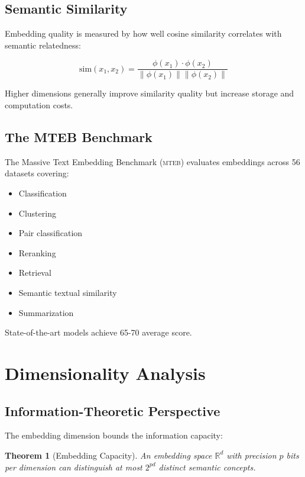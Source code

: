 \documentclass[11pt,letterpaper]{article}
\newtheorem{theorem}{Theorem}[section]
\newcommand{\MTEB}{\textsc{mteb}}
\begin{document}
\subsection{Semantic Similarity}

Embedding quality is measured by how well cosine similarity correlates with semantic relatedness:

\begin{equation}
\text{sim}(x_1, x_2) = \frac{\phi(x_1) \cdot \phi(x_2)}{\|\phi(x_1)\| \|\phi(x_2)\|}
\end{equation}

Higher dimensions generally improve similarity quality but increase storage and computation costs.

\subsection{The MTEB Benchmark}

The Massive Text Embedding Benchmark (\MTEB{}) evaluates embeddings across 56 datasets covering:
\begin{itemize}
    \item Classification
    \item Clustering
    \item Pair classification
    \item Reranking
    \item Retrieval
    \item Semantic textual similarity
    \item Summarization
\end{itemize}

State-of-the-art models achieve 65-70 average score.

\section{Dimensionality Analysis}
\label{sec:analysis}

\subsection{Information-Theoretic Perspective}

The embedding dimension bounds the information capacity:

\begin{theorem}[Embedding Capacity]
An embedding space $\mathbb{R}^d$ with precision $p$ bits per dimension can distinguish at most $2^{pd}$ distinct semantic concepts.
\end{theorem}
\end{document}
